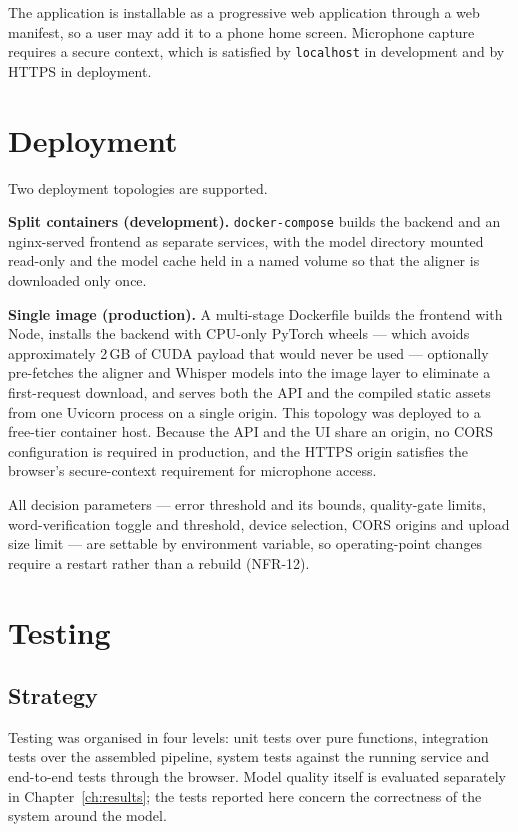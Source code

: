 The application is installable as a progressive web application through a web
manifest, so a user may add it to a phone home screen. Microphone capture
requires a secure context, which is satisfied by \texttt{localhost} in
development and by HTTPS in deployment.

\section{Deployment}
\label{sec:impl-deploy}

Two deployment topologies are supported.

\textbf{Split containers (development).} \texttt{docker-compose} builds the
backend and an nginx-served frontend as separate services, with the model
directory mounted read-only and the model cache held in a named volume so that
the aligner is downloaded only once.

\textbf{Single image (production).} A multi-stage Dockerfile builds the frontend
with Node, installs the backend with CPU-only PyTorch wheels --- which avoids
approximately 2\,GB of CUDA payload that would never be used --- optionally
pre-fetches the aligner and Whisper models into the image layer to eliminate a
first-request download, and serves both the API and the compiled static assets
from one Uvicorn process on a single origin. This topology was deployed to a
free-tier container host. Because the API and the UI share an origin, no CORS
configuration is required in production, and the HTTPS origin satisfies the
browser's secure-context requirement for microphone access.

All decision parameters --- error threshold and its bounds, quality-gate limits,
word-verification toggle and threshold, device selection, CORS origins and
upload size limit --- are settable by environment variable, so operating-point
changes require a restart rather than a rebuild (NFR-12).

\section{Testing}
\label{sec:testing}

\subsection{Strategy}

Testing was organised in four levels: unit tests over pure functions,
integration tests over the assembled pipeline, system tests against the running
service and end-to-end tests through the browser. Model quality itself is
evaluated separately in Chapter~\ref{ch:results}; the tests reported here
concern the correctness of the system around the model.

